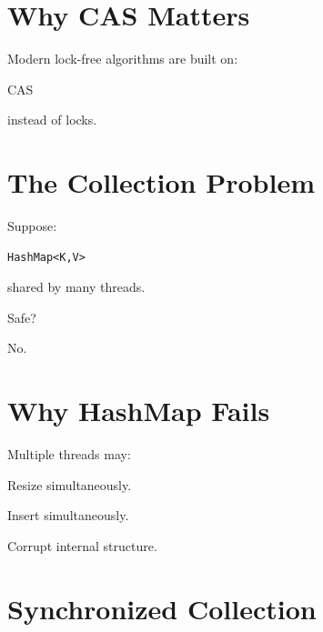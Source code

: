 \documentclass[11pt,a4paper]{book}
\begin{document}
\section{Why CAS Matters}

Modern lock-free algorithms
are built on:


CAS


instead of locks.


\section{The Collection Problem}

Suppose:

\begin{verbatim} 
HashMap<K,V>
\end{verbatim}

shared by many threads.


Safe?


No.


\section{Why HashMap Fails}

Multiple threads may:


Resize simultaneously.


Insert simultaneously.


Corrupt internal structure.


\section{Synchronized Collection}
\end{document}
